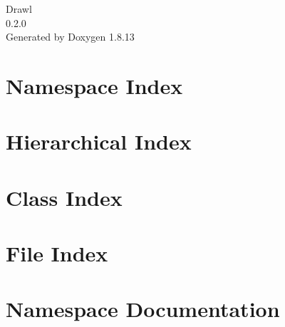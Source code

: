 \documentclass[twoside]{book}
\newcommand{\+}{\discretionary{\mbox{\scriptsize$\hookleftarrow$}}{}{}}
\newcommand{\clearemptydoublepage}{%
  \newpage{\pagestyle{empty}\cleardoublepage}%
}
\begin{document}
\hypersetup{pageanchor=false,
             bookmarksnumbered=true,
             pdfencoding=unicode
            }
\begin{titlepage}
\vspace*{7cm}
\begin{center}%
{\Large Drawl \\[1ex]\large 0.\+2.\+0 }\\
\vspace*{1cm}
{\large Generated by Doxygen 1.8.13}\\
\end{center}
\end{titlepage}
\clearemptydoublepage
{}
\tableofcontents
\clearemptydoublepage
{}
\hypersetup{pageanchor=true}

\chapter{Namespace Index}

\chapter{Hierarchical Index}

\chapter{Class Index}

\chapter{File Index}

\chapter{Namespace Documentation}




\end{document}
